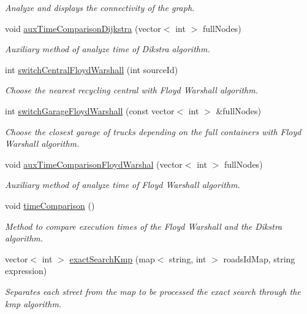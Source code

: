 \begin{DoxyCompactItemize}
\begin{DoxyCompactList}\small\item\em Analyze and displays the connectivity of the graph. \end{DoxyCompactList}\item 
void \hyperlink{classSmartWaste_a8b92a14b2fc83e86d9fa797dec00ae0e}{aux\+Time\+Comparison\+Dijkstra} (vector$<$ int $>$ full\+Nodes)
\begin{DoxyCompactList}\small\item\em Auxiliary method of analyze time of Dikstra algorithm. \end{DoxyCompactList}\item 
int \hyperlink{classSmartWaste_a69c3a37338ea2c3c49b3e600d45a7afa}{switch\+Central\+Floyd\+Warshall} (int source\+Id)
\begin{DoxyCompactList}\small\item\em Choose the nearest recycling central with Floyd Warshall algorithm. \end{DoxyCompactList}\item 
int \hyperlink{classSmartWaste_a3440495b88d51595261af349753c3b4e}{switch\+Garage\+Floyd\+Warshall} (const vector$<$ int $>$ \&full\+Nodes)
\begin{DoxyCompactList}\small\item\em Choose the closest garage of trucks depending on the full containers with Floyd Warshall algorithm. \end{DoxyCompactList}\item 
void \hyperlink{classSmartWaste_a0cd6a174d186a2cf5e4d4de10df0b48c}{aux\+Time\+Comparison\+Floyd\+Warshal} (vector$<$ int $>$ full\+Nodes)
\begin{DoxyCompactList}\small\item\em Auxiliary method of analyze time of Floyd Warshall algorithm. \end{DoxyCompactList}\item 
void \hyperlink{classSmartWaste_a9afdadb947d0c2fcb979e3470c4e2721}{time\+Comparison} ()
\begin{DoxyCompactList}\small\item\em Method to compare execution times of the Floyd Warshall and the Dikstra algorithm. \end{DoxyCompactList}\item 
vector$<$ int $>$ \hyperlink{classSmartWaste_ad697e11bb3f1bb7524f939f90a6fbe9c}{exact\+Search\+Kmp} (map$<$ string, int $>$ roads\+Id\+Map, string expression)
\begin{DoxyCompactList}\small\item\em Separates each street from the map to be processed the exact search through the kmp algorithm. \end{DoxyCompactList}\item 

\end{DoxyCompactItemize}
